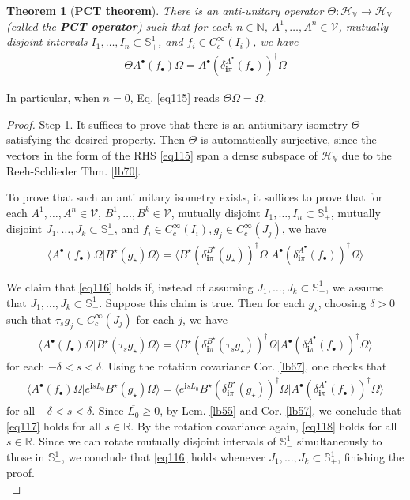 \documentclass[12pt,b5paper,notitlepage]{article}
\theoremstyle{definition}
\theoremstyle{plain}
\newtheorem{thm}[df]{Theorem}
\newcommand{\ovl}{\overline}
\newcommand{\bk}[1]{\langle {#1}\rangle}
\newcommand{\im}{\mathbf{i}}
\newcommand{\blt}{\bullet}
\newcommand{\Nbb}{\mathbb N}
\newcommand{\Rbb}{\mathbb R}
\newcommand{\Sbb}{{\mathbb S}}
\newcommand{\HV}{\mathcal H_{\mathbb V}}
\newcommand{\MV}{\mathcal V}
\numberwithin{equation}{section}
\begin{document}
\begin{thm}[\textbf{PCT theorem}]\label{lb86}
There is an anti-unitary operator $\Theta:\HV\rightarrow\HV$ (called the \textbf{PCT operator})  such that for each $n\in\Nbb$, $A^1,\dots,A^n\in\MV$, mutually disjoint intervals $I_1,\dots,I_n\subset\Sbb^1_+$, and $f_i\in C^\infty_c(I_i)$, we have
\begin{align}\label{eq115}
\Theta A^\blt(f_\blt)\Omega=A^\blt(\delta^{A^\blt}_{\im\pi}(f_\blt))^\dagger\Omega
\end{align}
\end{thm}

In particular, when $n=0$, Eq. \eqref{eq115} reads $\Theta\Omega=\Omega$.

\begin{proof}
Step 1. It suffices to prove that there is an antiunitary isometry $\Theta$ satisfying the desired property. Then $\Theta$ is automatically surjective, since the vectors in the form of the RHS \eqref{eq115} span a dense subspace of $\HV$ due to the Reeh-Schlieder Thm. \ref{lb70}.

To prove that such an antiunitary isometry exists, it suffices to prove that for each $A^1,\dots,A^n\in\MV$, $B^1,\dots,B^k\in\MV$, mutually disjoint $I_1,\dots,I_n\subset\Sbb^1_+$, mutually disjoint $J_1,\dots,J_k\subset\Sbb^1_+$, and $f_i\in C_c^\infty(I_i),g_j\in C_c^\infty(J_j)$, we have
\begin{align}\label{eq116}
\bk{A^\blt(f_\blt)\Omega|B^\star(g_\star)\Omega}=\bk{B^\star(\delta^{B^\star}_{\im\pi}(g_\star))^\dagger\Omega|A^\blt(\delta_{\im\pi}^{A^\blt}(f_\blt))^\dagger\Omega}
\end{align}

We claim that \eqref{eq116} holds if, instead of assuming $J_1,\dots,J_k\subset\Sbb^1_+$, we assume that $J_1,\dots,J_k\subset\Sbb^1_-$. Suppose this claim is true. Then for each $g_\star$, choosing $\delta>0$ such that $\tau_sg_j\in C_c^\infty(J_j)$ for each $j$, we have
\begin{align*}
\bk{A^\blt(f_\blt)\Omega|B^\star(\tau_sg_\star)\Omega}=\bk{B^\star(\delta^{B^\star}_{\im\pi}(\tau_sg_\star))^\dagger\Omega|A^\blt(\delta_{\im\pi}^{A^\blt}(f_\blt))^\dagger\Omega} \tag{$\triangle$} \label{eq118}
\end{align*}
for each $-\delta<s<\delta$. Using the rotation covariance Cor. \ref{lb67}, one checks that
\begin{align*}
\bk{A^\blt(f_\blt)\Omega|e^{\im s\ovl{L_0}}B^\star(g_\star)\Omega}=\bk{e^{\im s\ovl{L_0}}B^\star(\delta^{B^\star}_{\im\pi}(g_\star))^\dagger\Omega|A^\blt(\delta_{\im\pi}^{A^\blt}(f_\blt))^\dagger\Omega}\tag{$\star$}\label{eq117}
\end{align*}
for all $-\delta<s<\delta$. Since $\ovl{L_0}\geq0$, by Lem. \ref{lb55} and Cor. \ref{lb57}, we conclude that \eqref{eq117} holds for all $s\in\Rbb$. By the rotation covariance again, \eqref{eq118} holds for all $s\in\Rbb$. Since we can rotate mutually disjoint intervals of $\Sbb^1_-$ simultaneously to those in $\Sbb^1_+$, we conclude that \eqref{eq116} holds whenever $J_1,\dots,J_k\subset\Sbb^1_+$, finishing the proof.\\[-1ex]



\end{proof}
\end{document}
